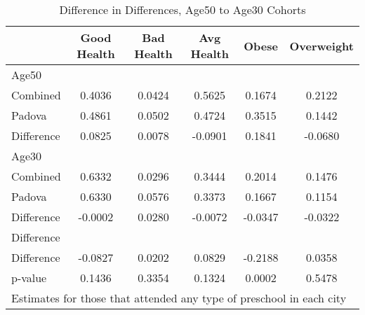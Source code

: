 \begin{table}[htbp]\centering
\caption{Difference in Differences, Age50 to Age30 Cohorts}
\begin{tabular}{l*{5}{c}}
\hline\hline
            & Good Health&  Bad Health&  Avg Health&       Obese&  Overweight\\
\hline
Age50       &            &            &            &            &            \\
Combined    &      0.4036&      0.0424&      0.5625&      0.1674&      0.2122\\
Padova      &      0.4861&      0.0502&      0.4724&      0.3515&      0.1442\\
Difference  &      0.0825&      0.0078&     -0.0901&      0.1841&     -0.0680\\
\hline
Age30       &            &            &            &            &            \\
Combined    &      0.6332&      0.0296&      0.3444&      0.2014&      0.1476\\
Padova      &      0.6330&      0.0576&      0.3373&      0.1667&      0.1154\\
Difference  &     -0.0002&      0.0280&     -0.0072&     -0.0347&     -0.0322\\
\hline
Difference  &            &            &            &            &            \\
Difference  &     -0.0827&      0.0202&      0.0829&     -0.2188&      0.0358\\
p-value     &      0.1436&      0.3354&      0.1324&      0.0002&      0.5478\\
\hline\hline
\multicolumn{6}{l}{\footnotesize Estimates for those that attended any type of preschool in each city}\\
\end{tabular}
\end{table}
